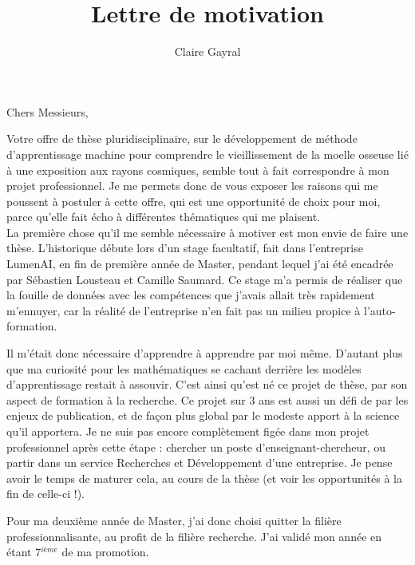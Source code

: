 \documentclass[a4paper,12pt]{article}
\title{Lettre de motivation}
\author{Claire Gayral}
\date{}
\begin{document}
\maketitle

Chers Messieurs,

Votre offre de thèse pluridisciplinaire, sur le développement de méthode d'apprentissage machine pour comprendre le vieillissement de la moelle osseuse lié à une exposition aux rayons cosmiques, semble tout à fait correspondre à mon projet professionnel. Je me permets donc de vous exposer les raisons qui me poussent à postuler à cette offre, qui est une opportunité de choix pour moi, parce qu'elle fait écho à différentes thématiques qui me plaisent. \\


La première chose qu'il me semble nécessaire à motiver est mon envie de faire une thèse. L'historique débute lors d'un stage facultatif, fait dans l'entreprise LumenAI, en fin de première année de Master, pendant lequel j'ai été encadrée par Sébastien Lousteau et Camille Saumard. Ce stage m'a permis de réaliser que la fouille de données avec les compétences que j'avais allait très rapidement m'ennuyer, car la réalité de l'entreprise n'en fait pas un milieu propice à l'auto-formation. 

Il m'était donc nécessaire d'apprendre à apprendre par moi même. D'autant plus que ma curiosité pour les mathématiques se cachant derrière les modèles d'apprentissage restait à assouvir.
C'est ainsi qu'est né ce projet de thèse, par son aspect de formation à la recherche.  
Ce projet sur 3 ans est aussi un défi de par les enjeux de publication, et de façon plus global par le modeste apport à la science qu'il apportera. Je ne suis pas encore complètement figée dans mon projet professionnel après cette étape : chercher un poste d'enseignant-chercheur, ou partir dans un service Recherches et Développement d'une entreprise. Je pense avoir le temps de maturer cela, au cours de la thèse (et voir les opportunités à la fin de celle-ci !). 


Pour ma deuxième année de Master, j'ai donc choisi quitter la filière professionnalisante, au profit de la filière recherche. J'ai validé mon année en étant 7$^{ième}$ de ma promotion. 
\end{document}
